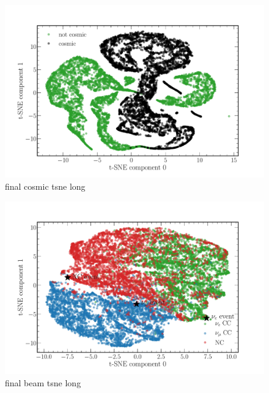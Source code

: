 \begin{figure} %
    \includegraphics[width=\textwidth]{diagrams/7-cvn/chipsnet/final_cosmic_tsne.pdf}
    \caption[final cosmic tsne short]
    {final cosmic tsne long}
    \label{fig:final_cosmic_tsne}
\end{figure} %

\begin{figure} %
    \includegraphics[width=\textwidth]{diagrams/7-cvn/chipsnet/final_beam_tsne.pdf}
    \caption[final beam tsne short]
    {final beam tsne long}
    \label{fig:final_beam_tsne}
\end{figure} %

